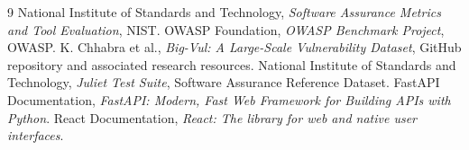 \documentclass[12pt,a4paper]{report}
\begin{document}
\begin{thebibliography}{9}
 National Institute of Standards and Technology, \textit{Software Assurance Metrics and Tool Evaluation}, NIST.
 OWASP Foundation, \textit{OWASP Benchmark Project}, OWASP.
 K. Chhabra et al., \textit{Big-Vul: A Large-Scale Vulnerability Dataset}, GitHub repository and associated research resources.
 National Institute of Standards and Technology, \textit{Juliet Test Suite}, Software Assurance Reference Dataset.
 FastAPI Documentation, \textit{FastAPI: Modern, Fast Web Framework for Building APIs with Python}.
 React Documentation, \textit{React: The library for web and native user interfaces}.
\end{thebibliography}
\end{document}
